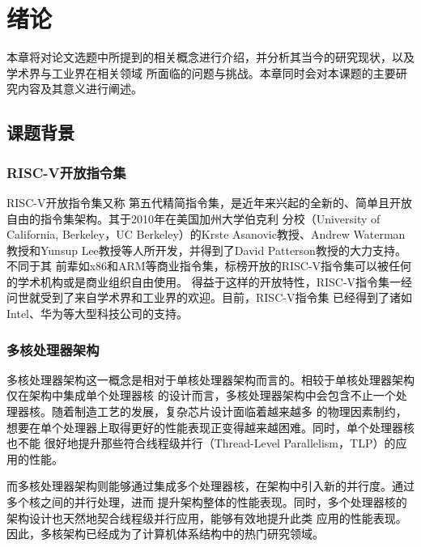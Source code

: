 
\section{绪论}

本章将对论文选题中所提到的相关概念进行介绍，并分析其当今的研究现状，以及学术界与工业界在相关领域
所面临的问题与挑战。本章同时会对本课题的主要研究内容及其意义进行阐述。

\subsection{课题背景}

\subsubsection{RISC-V开放指令集}
\label{section:background_riscv}

RISC-V开放指令集\cite{waterman2016design}又称
第五代精简指令集，是近年来兴起的全新的、简单且开放自由的指令集架构。其于2010年在美国加州大学伯克利
分校（University of California, Berkeley，UC Berkeley）的Krste Asanovic教授、Andrew
Waterman教授和Yunsup Lee教授等人所开发，并得到了David Patterson教授的大力支持。不同于其
前辈如x86和ARM等商业指令集，标榜开放的RISC-V指令集可以被任何的学术机构或是商业组织自由使用。
得益于这样的开放特性，RISC-V指令集一经问世就受到了来自学术界和工业界的欢迎。目前，RISC-V指令集
已经得到了诸如Intel、华为等大型科技公司的支持\cite{riscvmember}。

\subsubsection{多核处理器架构}
\label{section:background_manycore}

多核处理器架构这一概念是相对于单核处理器架构而言的。相较于单核处理器架构仅在架构中集成单个处理器核
的设计而言，多核处理器架构中会包含不止一个处理器核。随着制造工艺的发展，复杂芯片设计面临着越来越多
的物理因素制约，想要在单个处理器上取得更好的性能表现正变得越来越困难。同时，单个处理器核也不能
很好地提升那些符合线程级并行（Thread-Level Parallelism，TLP）的应用的性能。

而多核处理器架构则能够通过集成多个处理器核，在架构中引入新的并行度。通过多个核之间的并行处理，进而
提升架构整体的性能表现。同时，多个处理器核的架构设计也天然地契合线程级并行应用，能够有效地提升此类
应用的性能表现。因此，多核架构已经成为了计算机体系结构中的热门研究领域。

